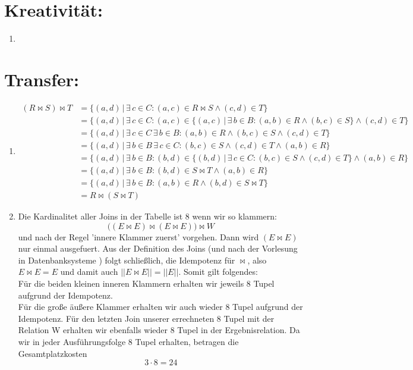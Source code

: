     \section*{Kreativität:}
    \begin{enumerate}[label=(\alph*)]
    	\item %
    \end{enumerate}
    \clearpage
    \section*{Transfer:}
    \begin{enumerate}[label=(\alph*)]
    	\item
        \begin{align*}
            (R \Join S) \Join T &= \{(a,d) \, | \, \exists\, c \in C : (a,c) \in R \Join S \land (c,d) \in T \}\\
            &=\{(a,d) \, | \, \exists\, c \in C : (a,c) \in \{(a,c) \,|\, \exists\, b \in B : (a,b) \in R \land (b,c) 
            \in S \}  \land (c,d) \in T \}\\
            &=\{(a,d) \, | \, \exists\, c \in C \, \exists\, b \in B : (a,b) \in R \land (b,c) \in S   \land (c,d) \in T \}\\
            &=\{(a,d) \, |  \, \exists\, b \in B \, \exists\, c \in C :  (b,c) \in S   \land (c,d) \in T \land (a,b) 
            \in R  \}\\
            &=\{(a,d) \, |  \, \exists\, b \in B : (b,d) \in \{(b,d) \,|\, \exists\, c \in C :  (b,c) \in S   
            \land (c,d) \in T\} \land (a,b) \in R  \}\\
            &=\{(a,d) \, |  \, \exists\, b \in B : (b,d) \in S\Join T \land (a,b) \in R  \}\\
            &=\{(a,d) \, |  \, \exists\, b \in B : (a,b) \in R \land (b,d) \in S\Join T  \}\\
            &=R \Join (S \Join T)
        \end{align*}
        \item
        Die Kardinalitet aller Joins in der Tabelle ist 8 wenn wir so klammern:
        $$  \bigg( (E \Join E) \Join (E \Join E) \bigg) \Join W$$
        und nach der Regel 'innere Klammer zuerst' vorgehen. Dann wird $(E \Join E)$ nur einmal ausgefuert. 
        Aus der Definition des Joins (und nach der Vorlesung in Datenbanksysteme ) folgt schließlich, die Idempotenz für $\Join$, also $E \Join E = E$ und damit auch $||E \Join E|| = ||E||$. Somit gilt folgendes:\\
        Für die beiden kleinen inneren Klammern erhalten wir jeweils 8 Tupel aufgrund der Idempotenz.\\
        Für die große äußere Klammer erhalten wir auch wieder 8 Tupel aufgrund der Idempotenz.
        Für den letzten Join unserer errechneten 8 Tupel mit der Relation W erhalten wir ebenfalls wieder 8 Tupel in der Ergebnisrelation. 
        Da wir in jeder Ausführungsfolge 8 Tupel erhalten, betragen die Gesamtplatzkosten 
        $$3\cdot 8 = 24$$
        
        
    \end{enumerate}
